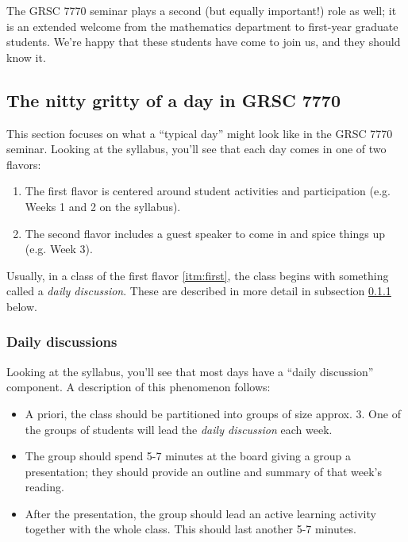 The GRSC 7770 seminar plays a second (but equally important!) role as well; it is an extended welcome from the mathematics department to first-year graduate students.  We're happy that these students have come to join us, and they should know it.



\subsection{The nitty gritty of a day in GRSC 7770}
\label{sec:nitty-gritty-day}

This section focuses on what a ``typical day'' might look like in the GRSC 7770 seminar.  Looking at the syllabus, you'll see that each day comes in one of two flavors:
\begin{enumerate}
\item \label{itm:first} The first flavor is centered around student activities and participation (e.g. Weeks 1 and 2 on the syllabus).
\item \label{itm:second} The second flavor includes a guest speaker to come in and spice things up (e.g. Week 3).
\end{enumerate}

Usually, in a class of the first flavor \eqref{itm:first}, the class begins with something called a \emph{daily discussion}.  These are described in more detail in subsection \ref{sec:daily-discussions} below.  

\subsubsection{Daily discussions}
\label{sec:daily-discussions}

Looking at the syllabus, you'll see that most days have a ``daily discussion'' component.  A description of this phenomenon follows:

\begin{itemize}
\item A priori, the class should be partitioned into groups of size approx. 3.  One of the groups of students will lead the \emph{daily discussion} each week.
\item The group should spend 5-7 minutes at the board giving a group a presentation; they should provide an outline and summary of that week's reading.  
\item After the presentation, the group should lead an active learning activity together with the whole class.  This should last another 5-7 minutes.  
\end{itemize}

